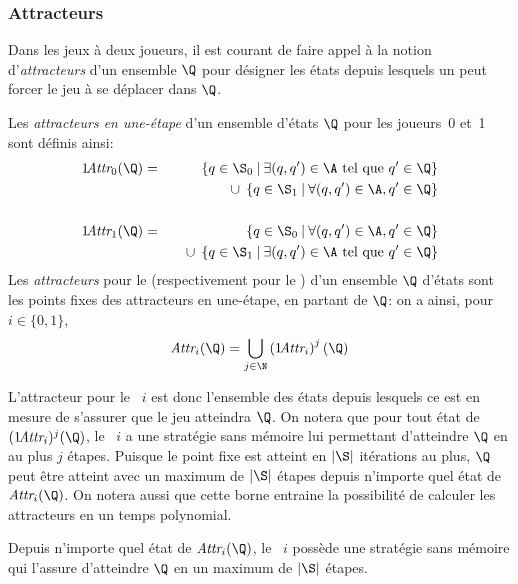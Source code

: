 \subsubsection{Attracteurs}

Dans les jeux à deux joueurs, il est courant de faire appel à la notion d'\emph{attracteurs} d'un ensemble $\Q$ pour désigner les états depuis lesquels un  peut forcer le jeu à se déplacer dans $\Q$.

\begin{definition}
Les \emph{attracteurs en une-étape} d'un ensemble d'états $\Q$ pour les joueurs~0 et~1 sont définis ainsi:
\begin{eqnarray*}
1\!\attractor{0}(\Q) & = & \left\{q \in \S_0 \mmid \exists (q,q') \in \A \textrm{ tel que } q' \in \Q \right\}             \\
                    &   & \quad\cup \;\left\{q \in \S_1 \mmid \forall (q,q') \in \A, q' \in \Q \right\}                    \\
                    &   &                                                                                                  \\
1\!\attractor{1}(\Q) & = & \left\{q \in \S_0 \mmid \forall (q,q') \in \A, q' \in \Q \right\}                               \\
                    &   & \quad \cup \;\left\{q \in \S_1 \mmid \exists (q,q') \in \A \textrm{ tel que } q' \in \Q \right\}
\end{eqnarray*}
Les \emph{attracteurs} pour le \jo (respectivement pour le \ji) d'un ensemble $\Q$ d'états sont les points fixes des attracteurs en une-étape, en partant de $\Q$: on a ainsi, pour $i \in \{0,1\}$, \[\attractor{i}(\Q) = \bigcup_{j \in \N} \left(1\!\attractor{i}\right)^j(\Q)\]
\end{definition}
L'attracteur pour le ~$i$ est donc l'ensemble des états depuis lesquels ce  est en mesure de s'assurer que le jeu atteindra $\Q$.
On notera que pour tout état de $(1\!\attractor{i})^j(\Q)$, le ~$i$ a une stratégie sans mémoire lui permettant d'atteindre $\Q$ en au plus $j$ étapes.
Puisque le point fixe est atteint en $|\S|$ itérations au plus, $\Q$ peut être atteint avec un maximum de $|\S|$ étapes depuis n'importe quel état de $\attractor{i}(\Q)$.
On notera aussi que cette borne entraine la possibilité de calculer les attracteurs en un temps polynomial.

\begin{lemma}
Depuis n'importe quel état de $\attractor{i}(\Q)$, le ~$i$ possède une stratégie sans mémoire qui l'assure d'atteindre $\Q$ en un maximum de $|\S|$ étapes.
\end{lemma}

